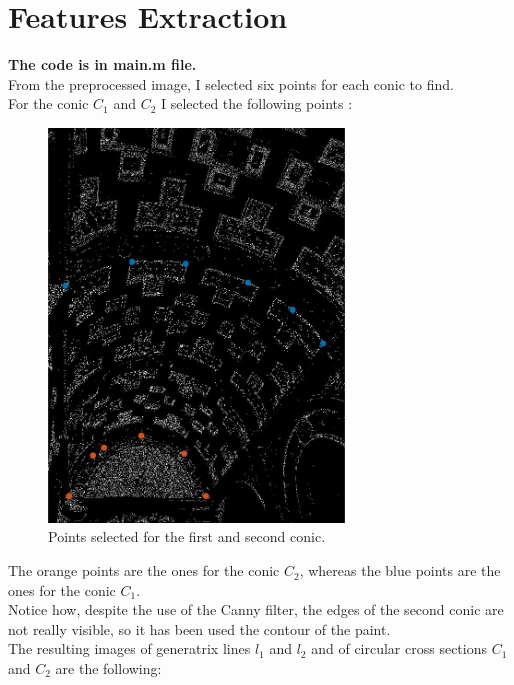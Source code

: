 \documentclass[a4paper, 11pt, oneside, openright, english]{book}
\begin{document}
\section{Features Extraction}
\textbf{The code is in main.m file.}\\
From the preprocessed image, I selected six points for each conic to find.\\
For the conic $C_1$ and $C_2$ I selected the following points : 
\begin{figure}[H]
    \centering
    \includegraphics[width=0.7\textwidth]{../images/pointsSelected.JPG}
    \caption{Points selected for the first and second conic.}
\end{figure}

The orange points are the ones for the conic $C_2$, whereas the blue points are the ones for the conic $C_1$.\\
Notice how, despite the use of the Canny filter, the edges of the second conic are not really visible, so it has been used the contour of the paint.\\
The resulting images of generatrix lines $l_1$ and $l_2$ and of circular cross sections $C_1$ and $C_2$ are the following:
\end{document}
